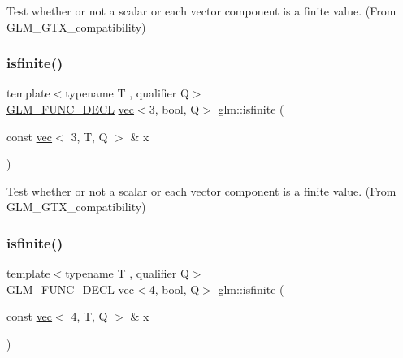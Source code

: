Test whether or not a scalar or each vector component is a finite value. (From G\+L\+M\+\_\+\+G\+T\+X\+\_\+compatibility) 

\mbox{\label{group__gtx__compatibility_ga929ef27f896d902c1771a2e5e150fc97}} 
\subsubsection{\texorpdfstring{isfinite()}{isfinite()}\hspace{0.1cm}{\footnotesize\ttfamily [4/5]}}
{\footnotesize\ttfamily template$<$typename T , qualifier Q$>$ \\
\mbox{\hyperlink{setup_8hpp_ab2d052de21a70539923e9bcbf6e83a51}{G\+L\+M\+\_\+\+F\+U\+N\+C\+\_\+\+D\+E\+CL}} \mbox{\hyperlink{structglm_1_1vec}{vec}}$<$3, bool, Q$>$ glm\+::isfinite (\begin{DoxyParamCaption}\item[{const \mbox{\hyperlink{structglm_1_1vec}{vec}}$<$ 3, T, Q $>$ \&}]{x }\end{DoxyParamCaption})}



Test whether or not a scalar or each vector component is a finite value. (From G\+L\+M\+\_\+\+G\+T\+X\+\_\+compatibility) 

\mbox{\label{group__gtx__compatibility_ga19925badbe10ce61df1d0de00be0b5ad}} 
\subsubsection{\texorpdfstring{isfinite()}{isfinite()}\hspace{0.1cm}{\footnotesize\ttfamily [5/5]}}
{\footnotesize\ttfamily template$<$typename T , qualifier Q$>$ \\
\mbox{\hyperlink{setup_8hpp_ab2d052de21a70539923e9bcbf6e83a51}{G\+L\+M\+\_\+\+F\+U\+N\+C\+\_\+\+D\+E\+CL}} \mbox{\hyperlink{structglm_1_1vec}{vec}}$<$4, bool, Q$>$ glm\+::isfinite (\begin{DoxyParamCaption}\item[{const \mbox{\hyperlink{structglm_1_1vec}{vec}}$<$ 4, T, Q $>$ \&}]{x }\end{DoxyParamCaption})}



